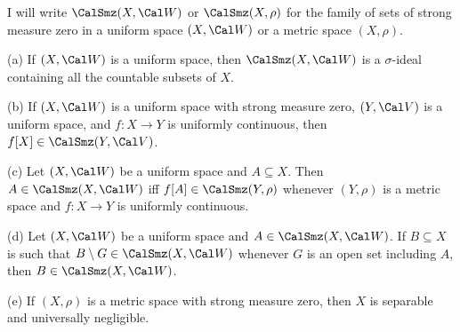 I will write $\CalSmz(X,\Cal W)$ or $\CalSmz(X,\rho)$ for the family of
sets of strong measure zero in a uniform space $(X,\Cal W)$ or a metric
space $(X,\rho)$.

 (a) If $(X,\Cal W)$ is a uniform space,
then $\CalSmz(X,\Cal W)$ is a $\sigma$-ideal
containing all the countable subsets of $X$.

(b) If $(X,\Cal W)$ is a uniform space with strong measure zero,
$(Y,\Cal V)$ is a uniform space, and $f:X\to Y$ is uniformly
continuous, then $f[X]\in\CalSmz(Y,\Cal V)$.

(c) Let $(X,\Cal W)$ be a uniform space and $A\subseteq X$.   Then
$A\in\CalSmz(X,\Cal W)$ iff $f[A]\in\CalSmz(Y,\rho)$ whenever $(Y,\rho)$ is
a metric space and $f:X\to Y$ is uniformly continuous.

(d) Let $(X,\Cal W)$ be a uniform space and $A\in\CalSmz(X,\Cal W)$.
If $B\subseteq X$ is such that $B\setminus G\in\CalSmz(X,\Cal W)$
whenever $G$ is an open set including $A$, then
$B\in\CalSmz(X,\Cal W)$.

(e) If $(X,\rho)$ is a metric space with
strong measure zero, then $X$ is separable and universally negligible.

